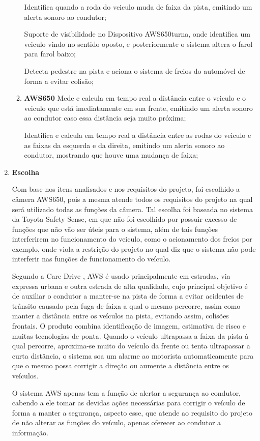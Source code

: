\begin{enumerate}
\begin{enumerate}
Identifica quando a roda do veiculo muda de faixa da pista, emitindo um alerta sonoro ao condutor;

Suporte de visibilidade no Dispositivo AWS650turna, onde identifica um veiculo vindo no sentido oposto, e posteriormente o sistema altera o farol para farol baixo;

Detecta pedestre na pista e aciona o sistema de freios do automóvel de forma a evitar colisão;

\item \textbf{AWS650}
Mede e calcula em tempo real a distância entre o veiculo e o veiculo que está imediatamente em sua frente, emitindo um alerta sonoro ao condutor caso essa distância seja muito próxima;

Identifica e calcula em tempo real a distância entre as rodas do veiculo e as faixas da esquerda e da direita, emitindo um alerta sonoro ao condutor, mostrando que houve uma mudança de faixa;
\end{enumerate}

\item \textbf{Escolha}

Com base nos itens analisados e nos requisitos do projeto, foi escolhido a câmera AWS650, pois a mesma atende todos os requisitos do projeto na qual será utilizado todas as funções da câmera. Tal escolha foi baseada no sistema  da Toyota Safety Sense, em que não foi escolhido por possuir excesso de funções que não vão ser úteis para o sistema, além de tais funções interferirem no funcionamento do veiculo, como o acionamento dos freios  por exemplo,  onde viola a restrição do projeto no qual diz que o sistema não pode interferir nas funções de funcionamento do veículo.

Segundo a Care Drive \cite{care_drive}, AWS é usado principalmente em estradas, via expressa urbana e outra estrada de alta qualidade, cujo principal objetivo é de auxiliar o condutor a manter-se na pista de forma a evitar acidentes de trânsito causado pela fuga de faixa a qual o mesmo percorre, assim como manter a  distância entre os veículos na pista, evitando assim, colisões frontais. O produto combina identificação de imagem, estimativa de risco e muitas tecnologias de ponta. Quando o veículo ultrapassa a faixa da pista à qual percorre, aproxima-se muito do veículo da frente ou tenta ultrapassar a curta distância, o sistema soa um alarme ao motorista automaticamente para que o mesmo possa corrigir a direção ou aumente a distância entre os veículos.

O sistema AWS apenas tem a função de alertar a segurança ao condutor, cabendo a ele tomar as devidas ações necessárias para corrigir o veículo de forma a manter a segurança, aspecto esse, que atende ao requisito do projeto de não alterar as funções do veículo, apenas oferecer ao condutor a informação.


\end{enumerate}
